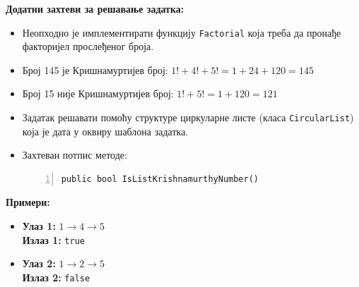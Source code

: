 \textbf{Додатни захтеви за решавање задатка:}
\begin{itemize}
    \item Неопходно је имплементирати функцију \texttt{Factorial} која треба да пронађе факторијел прослеђеног броја.
    \item Број 145 је Кришнамуртијев број: $1! + 4! + 5! = 1 + 24 + 120 = 145$
    \item Број 15 није Кришнамуртијев број: $1! + 5! = 1 + 120 = 121$
    \item Задатак решавати помоћу структуре циркуларне листе (класа \texttt{CircularList}) која је дата у оквиру шаблона задатка.
    \item Захтеван потпис методе:
    \begin{Verbatim}[fontsize=\footnotesize, numbers=left, xleftmargin=10mm]
public bool IsListKrishnamurthyNumber()
    \end{Verbatim}
\end{itemize}

\textbf{Примери:}
\begin{itemize}
    \item \textbf{Улаз 1:} $1 \rightarrow 4 \rightarrow 5$ \\
          \textbf{Излаз 1:} \texttt{true}
    \item \textbf{Улаз 2:} $1 \rightarrow 2 \rightarrow 5$ \\
          \textbf{Излаз 2:} \texttt{false}
\end{itemize}

